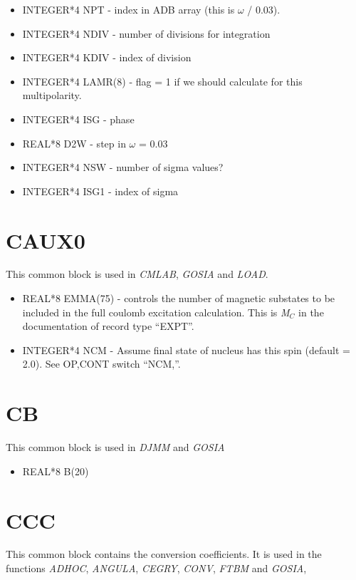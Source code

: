 \begin{itemize}
\item INTEGER*4 NPT - index in ADB array (this is $\omega$ / 0.03).
\item INTEGER*4 NDIV - number of divisions for integration
\item INTEGER*4 KDIV - index of division
\item INTEGER*4 LAMR(8) - flag = 1 if we should calculate for this
multipolarity.
\item INTEGER*4 ISG - phase
\item REAL*8 D2W - step in $\omega$ = 0.03
\item INTEGER*4 NSW - number of sigma values?
\item INTEGER*4 ISG1 - index of sigma
\end{itemize}

\section{CAUX0}

This common block is used in \emph{CMLAB}, \emph{GOSIA} and \emph{LOAD}.

\begin{itemize}
\item REAL*8 EMMA(75) - controls the number of magnetic substates to be
included in the full coulomb excitation calculation. This is \emph{M$_C$} in
the documentation of record type ``EXPT''.
\item INTEGER*4 NCM - Assume final state of nucleus has this spin (default =
2.0). See OP,CONT switch ``NCM,''.
\end{itemize}

\section{CB}

This common block is used in \emph{DJMM} and \emph{GOSIA}

\begin{itemize}
\item REAL*8 B(20)
\end{itemize}

\section{CCC}

This common block contains the conversion coefficients. It is used in the
functions \emph{ADHOC}, \emph{ANGULA}, \emph{CEGRY}, \emph{CONV}, \emph{FTBM}
and \emph{GOSIA}, \emph{}

